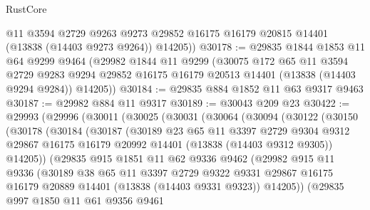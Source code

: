\begin{lexlean}{RustCore}
\begin{coremodule}
        @11
        @3594
        @2729
        @9263
        @9273
        @29852
        @16175
        @16179
        @20815
        @14401
        (@13838 (@14403 @9273 @9264))
        @14205))
@30178 := @29835
    @1844
    @1853
    @11
    @64
    @9299
    @9464
    (@29982
      @1844
      @11
      @9299
      (@30075
        @172
        @65
        @11
        @3594
        @2729
        @9283
        @9294
        @29852
        @16175
        @16179
        @20513
        @14401
        (@13838 (@14403 @9294 @9284))
        @14205))
@30184 := @29835 @884 @1852 @11 @63 @9317 @9463
@30187 := @29982 @884 @11 @9317
@30189 := @30043 @209 @23
@30422 := @29993
    (@29996
      (@30011
        (@30025
          (@30031
            (@30064
              (@30094
                (@30122
                  (@30150
                    (@30178
                      (@30184
                        (@30187
                          (@30189
                            @23
                            @65
                            @11
                            @3397
                            @2729
                            @9304
                            @9312
                            @29867
                            @16175
                            @16179
                            @20992
                            @14401
                            (@13838 (@14403 @9312 @9305))
                            @14205))
                        (@29835
                          @915
                          @1851
                          @11
                          @62
                          @9336
                          @9462
                          (@29982
                            @915
                            @11
                            @9336
                            (@30189
                              @38
                              @65
                              @11
                              @3397
                              @2729
                              @9322
                              @9331
                              @29867
                              @16175
                              @16179
                              @20889
                              @14401
                              (@13838 (@14403 @9331 @9323))
                              @14205))
                          (@29835
                            @997
                            @1850
                            @11
                            @61
                            @9356
                            @9461

\end{coremodule}
\end{lexlean}
